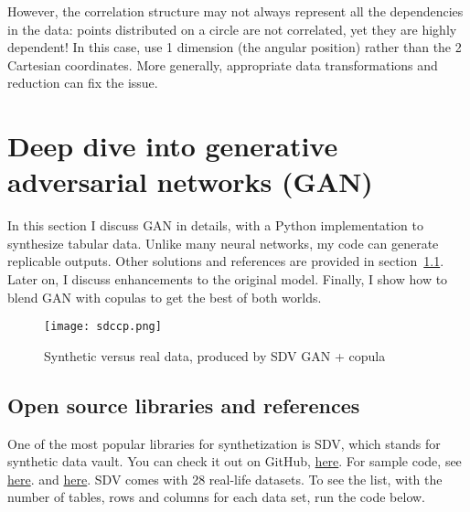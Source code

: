 \documentclass[oneside,10pt]{book}
\begin{document}
However, the correlation structure may not always represent all the dependencies in the data: points distributed on a circle are not correlated, yet they are highly dependent! In this case, use 1 dimension (the angular position)  rather than
 the 2 Cartesian coordinates. More generally, appropriate data transformations and reduction can fix the issue.


\section{Deep dive into generative adversarial networks (GAN)}

In this section I discuss GAN in details, with a Python implementation to synthesize tabular data. Unlike many neural networks, my code can generate replicable outputs.
Other solutions and references are provided in section~\ref{xcvcx}. Later on, I discuss enhancements to the original model. Finally, I show how to blend GAN with copulas to get the best
 of both worlds.


\begin{figure}[H]
\centering
\texttt{[image: sdccp.png]}
\caption{Synthetic versus real data, produced by SDV GAN + copula}
\label{fig:pictty}
\end{figure}

\subsection{Open source libraries and references}\label{xcvcx}

One of the most popular libraries for synthetization is SDV, which stands for
\textcolor{index}{synthetic data vault}. You can check it out on GitHub,
 \href{https://github.com/sdv-dev/SDV}{here}. For sample code,
 see \href{https://medium.com/@davide.gazze/sdv-generate-synthetic-data-using-gan-and-python-4c26a1e4b3c2}{here}.
and \href{https://bobrupakroy.medium.com/gan-based-deep-learning-data-synthesizer-copulagan-a6376169b3ca}{here}.
SDV comes with 28 real-life datasets. To see the list, with the number of tables, rows and columns for each data set, run the code below. \vspace{1ex}
\end{document}
